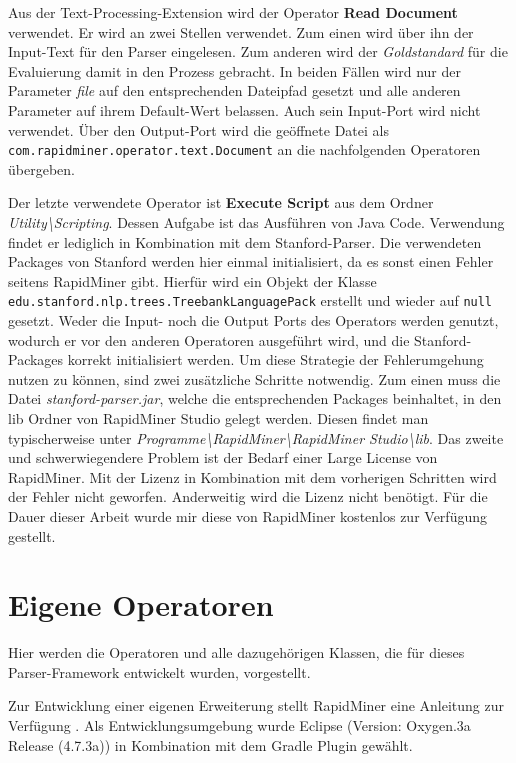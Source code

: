 Aus der Text-Processing-Extension wird der Operator \textbf{Read Document} verwendet. Er wird an zwei Stellen verwendet. Zum einen wird über ihn der Input-Text für den Parser eingelesen. Zum anderen wird der \textit{Goldstandard} für die Evaluierung damit in den Prozess gebracht. In beiden Fällen wird nur der Parameter \textit{file} auf den entsprechenden Dateipfad gesetzt und alle anderen Parameter auf ihrem Default-Wert belassen. Auch sein Input-Port wird nicht verwendet. Über den Output-Port wird die geöffnete Datei als \texttt{com.rapidminer.operator.text.Document} an die nachfolgenden Operatoren übergeben.

Der letzte verwendete Operator ist \textbf{Execute Script} aus dem Ordner \textit{Utility\textbackslash Scripting}. Dessen Aufgabe ist das Ausführen von Java Code. Verwendung findet er lediglich in Kombination mit dem Stanford-Parser. Die verwendeten Packages von Stanford werden hier einmal initialisiert, da es sonst einen Fehler seitens RapidMiner gibt. Hierfür wird ein Objekt der Klasse  \texttt{edu.stanford.nlp.trees.TreebankLanguagePack} erstellt und wieder auf \texttt{null} gesetzt. Weder die Input- noch die Output Ports des Operators werden genutzt, wodurch er vor den anderen Operatoren ausgeführt wird, und die Stanford-Packages korrekt initialisiert werden. Um diese Strategie der Fehlerumgehung nutzen zu können, sind zwei zusätzliche Schritte notwendig. Zum einen muss die Datei \textit{stanford-parser.jar}, welche die entsprechenden Packages beinhaltet, in den lib Ordner von RapidMiner Studio gelegt werden. Diesen findet man typischerweise unter \textit{Programme\textbackslash RapidMiner\textbackslash RapidMiner Studio\textbackslash  lib}. Das zweite und schwerwiegendere Problem ist der Bedarf einer Large License von RapidMiner. Mit der Lizenz in Kombination mit dem vorherigen Schritten wird der Fehler nicht geworfen. Anderweitig wird die Lizenz nicht benötigt. Für die Dauer dieser Arbeit wurde mir diese von RapidMiner kostenlos zur Verfügung gestellt.
\section{Eigene Operatoren}
\label{sec:impl:eigene}

Hier werden die Operatoren und alle dazugehörigen Klassen, die für dieses Parser-Framework entwickelt wurden, vorgestellt. 

Zur Entwicklung einer eigenen Erweiterung stellt RapidMiner eine Anleitung zur Verfügung \cite{rmguide}. %
Als Entwicklungsumgebung wurde Eclipse (Version: Oxygen.3a Release (4.7.3a)) in Kombination mit dem Gradle Plugin  gewählt. 

